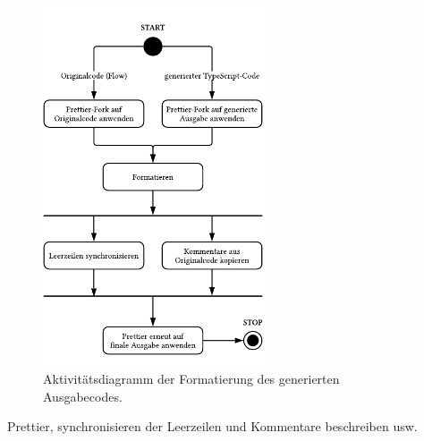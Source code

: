 \begin{figure}[htbp]
  \centering
  \includegraphics[width=0.6\textwidth]{src/4_Umsetzung/img/activity-diagram-formatting.pdf}
  \captionsetup{justification=centering}
	\caption[Aktivitätsdiagramm der Formatierung des Ausgabecodes]{Aktivitätsdiagramm der Formatierung des generierten Ausgabecodes.}
	\label{fig:activity-diagram-formatting}
\end{figure}

Prettier, synchronisieren der Leerzeilen und Kommentare beschreiben usw.
